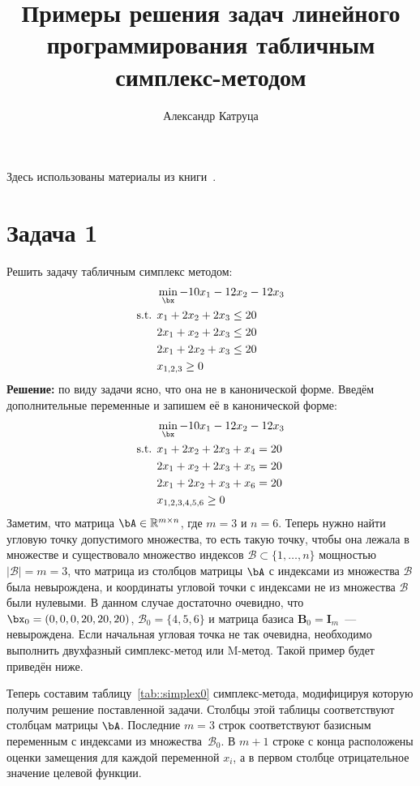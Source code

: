 \documentclass[12pt]{article}
\title{Примеры решения задач линейного программирования табличным симплекс-методом}
\author{Александр Катруца}
\date{}
\begin{document}
\maketitle
Здесь использованы материалы из книги~\cite{intro2lin}. 
\section{Задача 1}
Решить задачу табличным симплекс методом:
\begin{equation*}
\begin{split}
& \min_{\bx} -10x_1 - 12x_2 - 12x_3\\
\text{s.t. } & x_1 + 2x_2 +2x_3 \leq 20\\
& 2x_1 + x_2 + 2x_3 \leq 20\\
& 2x_1 + 2x_2 + x_3 \leq 20\\
& x_{1,2,3} \geq 0
\end{split}
\end{equation*}
\textbf{Решение:} по виду задачи ясно, что она не в канонической  форме. 
Введём дополнительные переменные и запишем её в канонической форме:
\begin{equation*}
\begin{split}
& \min_{\bx} -10x_1 - 12x_2 - 12x_3\\
\text{s.t. } & x_1 + 2x_2 +2x_3 + x_4 = 20\\
& 2x_1 + x_2 + 2x_3 + x_5 = 20\\
& 2x_1 + 2x_2 + x_3 + x_6 = 20\\
& x_{1,2,3,4,5,6} \geq 0
\end{split}
\end{equation*}
Заметим, что матрица $\bA \in \mathbb{R}^{m \times n}$, где $m=3$ и $n=6$.
Теперь нужно найти угловую точку допустимого множества, то есть такую точку, чтобы она лежала в множестве и существовало множество индексов $\mathcal{B} \subset \{1, \dots, n\}$ мощностью $|\mathcal{B}| = m = 3$, что матрица из столбцов матрицы $\bA$ с индексами из множества $\mathcal{B}$ была невырождена, и координаты угловой точки с индексами не из множества $\mathcal{B}$ были нулевыми.
В данном случае достаточно очевидно, что $\bx_0 = (0, 0, 0, 20, 20, 20)$, $\mathcal{B}_0 = \{4, 5, 6 \}$ и матрица базиса $\mathbf{B}_0 = \mathbf{I}_m$~--- невырождена.
Если начальная угловая точка не так очевидна, необходимо выполнить двухфазный симплекс-метод или M-метод. 
Такой пример будет приведён ниже.

Теперь составим таблицу~\ref{tab::simplex0} симплекс-метода, модифицируя которую получим решение поставленной задачи.
Столбцы этой таблицы соответствуют столбцам матрицы $\bA$. 
Последние $m=3$ строк соответствуют базисным переменным с индексами из множества~$\mathcal{B}_0$.
В $m+1$ строке с конца расположены оценки замещения для каждой переменной $x_i$, а в первом столбце отрицательное значение целевой функции.
\end{document}
